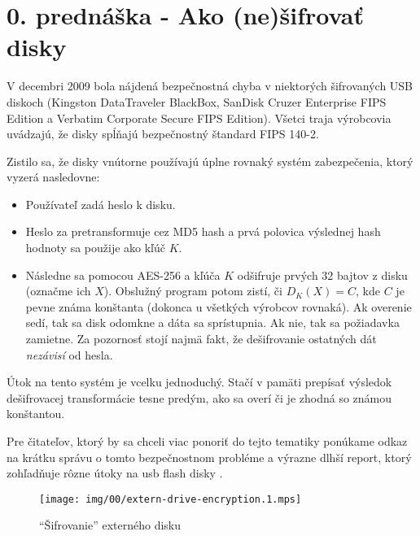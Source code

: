 \section{0. prednáška - Ako (ne)šifrovať disky}

V decembri 2009 bola nájdená bezpečnostná chyba
v niektorých šifrovaných USB diskoch
(Kingston DataTraveler BlackBox, SanDisk Cruzer Enterprise FIPS Edition a
Verbatim Corporate Secure FIPS Edition).
Všetci traja výrobcovia uvádzajú, že disky spĺňajú bezpečnostný 
štandard FIPS 140-2.

Zistilo sa, že disky vnútorne používajú úplne rovnaký systém zabezpečenia,
ktorý vyzerá nasledovne:
\begin{itemize}
    \item Používateľ zadá heslo k disku.
    \item Heslo za pretransformuje cez MD5 hash a prvá polovica
        výslednej hash hodnoty sa použije ako kľúč $K$.
    \item Následne sa pomocou AES-256 a kľúča $K$ odšifruje
        prvých 32 bajtov z disku (označme ich $X$).
        Obslužný program potom zistí, či $D_K(X)=C$,
        kde $C$ je pevne známa konštanta
        (dokonca u všetkých výrobcov rovnaká).
        Ak overenie sedí, tak sa disk odomkne a dáta sa sprístupnia.
        Ak nie, tak sa požiadavka zamietne.
        Za pozornosť stojí najmä fakt, že dešifrovanie ostatných dát
        \emph{nezávisí} od hesla.
\end{itemize}

Útok na tento systém je vcelku jednoduchý.
Stačí v pamäti prepísať výsledok dešifrovacej transformácie tesne
predým, ako sa overí či je zhodná so známou konštantou.

Pre čitateľov, ktorý by sa chceli viac ponoriť do tejto tematiky
ponúkame odkaz na krátku správu o tomto bezpečnostnom probléme
\cite{drive_enc} a výrazne dlhší report, ktorý zohľadňuje rôzne útoky
na usb flash disky
\cite{usb_flash_enc}.


\begin{figure}[htp]
    \centering
    \texttt{[image: img/00/extern-drive-encryption.1.mps]}
    \label{fig:extern_drive_encryption}
    \caption{``Šifrovanie'' externého disku}
\end{figure}

